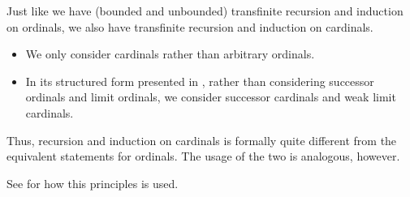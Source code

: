 \begin{remark}\label{rem:cardinal_transfinite_recursion_and_induction}
  Just like we have (bounded and unbounded) transfinite recursion and induction on ordinals, we also have transfinite recursion and induction on cardinals.
  \begin{itemize}
    \item We only consider cardinals rather than arbitrary ordinals.
    \item In its structured form presented in , rather than considering successor ordinals and limit ordinals, we consider successor cardinals and weak limit cardinals.
  \end{itemize}

  Thus, recursion and induction on cardinals is formally quite different from the equivalent statements for ordinals. The usage of the two is analogous, however.

  See  for how this principles is used.
\end{remark}


